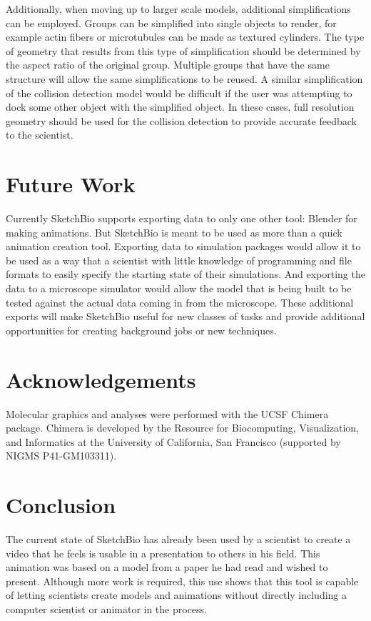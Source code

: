 \documentclass{article} %
\begin{document}
Additionally, when moving up to larger scale models, additional simplifications can be employed.  Groups can be simplified into single objects to render, for example actin fibers or microtubules can be made as textured cylinders.  The type of geometry that results from this type of simplification should be determined by the aspect ratio of the original group.  Multiple groups that have the same structure will allow the same simplifications to be reused.  A similar simplification of the collision detection model would be difficult if the user was attempting to dock some other object with the simplified object.  In these cases, full resolution geometry should be used for the collision detection to provide accurate feedback to the scientist.

\section{Future Work}
Currently SketchBio supports exporting data to only one other tool: Blender for making animations.  But SketchBio is meant to be used as more than a quick animation creation tool.  Exporting data to simulation packages would allow it to be used as a way that a scientist with little knowledge of programming and file formats to easily specify the starting state of their simulations.  And exporting the data to a microscope simulator would allow the model that is being built to be tested against the actual data coming in from the microscope.  These additional exports will make SketchBio useful for new classes of tasks and provide additional opportunities for creating background jobs or new techniques.

\section{Acknowledgements}
Molecular graphics and analyses were performed with the UCSF Chimera package. Chimera is developed by the Resource for Biocomputing, Visualization, and Informatics at the University of California, San Francisco (supported by NIGMS P41-GM103311).

\section{Conclusion}
The current state of SketchBio has already been used by a scientist to create a video that he feels is usable in a presentation to others in his field.  This animation was based on a model from a paper he had read and wished to present.  Although more work is required, this use shows that this tool is capable of letting scientists create models and animations without directly including a computer scientist or animator in the process.



\end{document}
